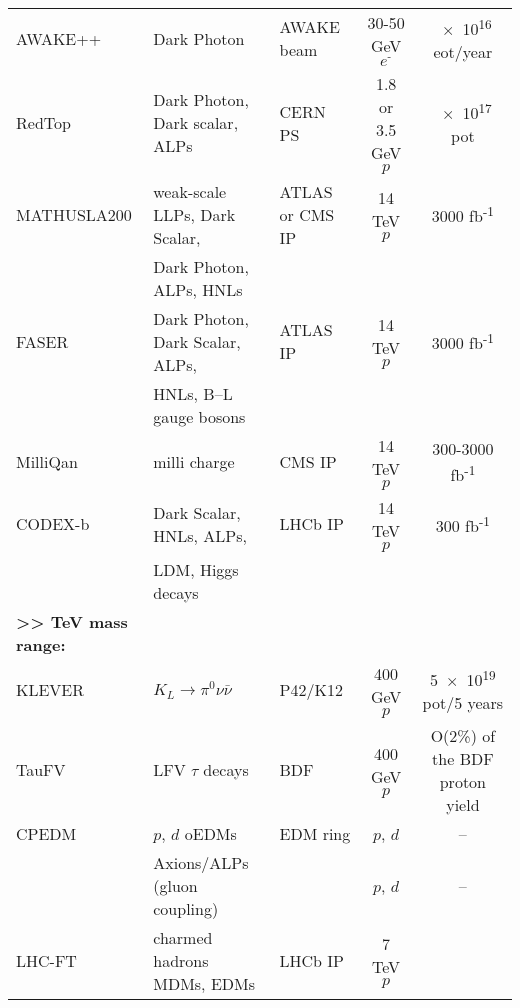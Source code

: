 \begin{landscape}
\begin{table}[h]
\begin{center}
\begin{tabular}{lllcc}
AWAKE++  & Dark Photon  & AWAKE beam  & 30-50 GeV $e^\text{-}$  & \num{e16} eot/year \\

RedTop  & Dark Photon, Dark scalar, ALPs  & CERN PS  & 1.8 or 3.5 GeV $p$ & \num{e17} pot \\

MATHUSLA200  & weak-scale LLPs, Dark Scalar,  & ATLAS or CMS IP  & 14 TeV $p$  &  3000 fb\textsuperscript{-1} \\
& Dark Photon, ALPs, HNLs  &  &  & \\

FASER  & Dark Photon, Dark Scalar, ALPs,  & ATLAS IP &  14 TeV $p$  & 3000 fb\textsuperscript{-1} \\
 & HNLs, B--L gauge bosons &  &  & \\

MilliQan  & milli charge &  CMS IP &  14 TeV $p$  & 300-3000 fb\textsuperscript{-1} \\

CODEX-b  & Dark Scalar, HNLs, ALPs,  & LHCb IP  & 14 TeV $p$  & 300 fb\textsuperscript{-1} \\
 & LDM, Higgs decays  &  &  & \\
\hline
\textbf{>> TeV mass range:}  &  &  &  & \\
\hline
KLEVER & $K_L \rightarrow \pi^0\nu\bar{\nu}$  & P42/K12  & 400 GeV $p$  & \num{5e19} pot/5 years \\
TauFV  & LFV $\tau$ decays  & BDF  & 400 GeV $p$  & O(2\%) of the BDF proton yield \\

CPEDM  & $p$, $d$ oEDMs &  EDM ring  & $p$, $d$ &  – \\
 & Axions/ALPs (gluon coupling)  & & $p$, $d$  & – \\

LHC-FT  & charmed hadrons MDMs, EDMs  & LHCb IP  & 7 TeV  $p$ & \\


\hline
\end{tabular}
\end{center}
\end{table}
\end{landscape}

\newpage

